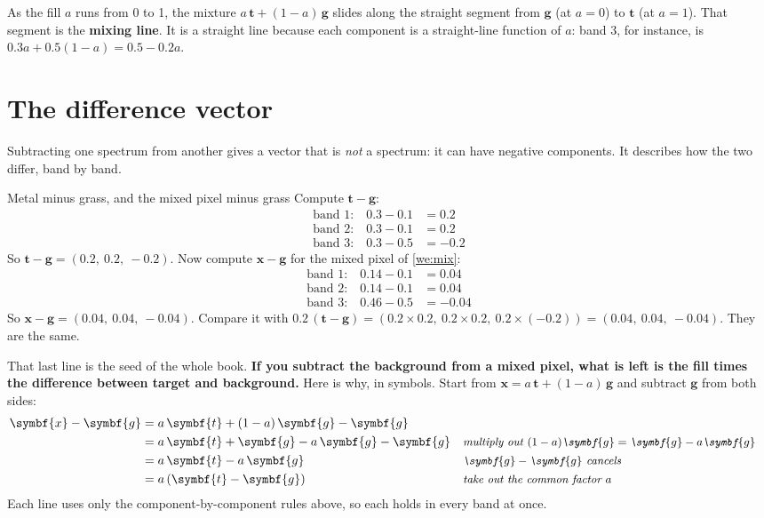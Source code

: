 \documentclass[11pt,a4paper,oneside,openany]{book}
\newcommand{\B}[1]{{\symbf{#1}}}
\newcommand{\B}[1]{{\bm{#1}}}
\newcommand{\vx}{\B{x}}
\newcommand{\vt}{\B{t}}
\newcommand{\vg}{\B{g}}
\newcommand{\why}[1]{&&\text{\small\itshape #1}}
\begin{document}
As the fill $a$ runs from 0 to 1, the mixture $a\,\vt+(1-a)\,\vg$ slides along the straight segment from $\vg$ (at
$a=0$) to $\vt$ (at $a=1$). That segment is the \textbf{mixing line}. It is a straight line because each component is a
straight-line function of $a$: band 3, for instance, is $0.3a+0.5(1-a)=0.5-0.2a$.

\section{The difference vector}

Subtracting one spectrum from another gives a vector that is \emph{not} a spectrum: it can have negative components. It
describes how the two differ, band by band.

\begin{worked}[label=we:diff]{Metal minus grass, and the mixed pixel minus grass}
Compute $\vt-\vg$:
\begin{align*}
\text{band 1:}\quad 0.3-0.1 &= 0.2\\
\text{band 2:}\quad 0.3-0.1 &= 0.2\\
\text{band 3:}\quad 0.3-0.5 &= -0.2
\end{align*}
So $\vt-\vg=(0.2,\ 0.2,\ -0.2)$. Now compute $\vx-\vg$ for the mixed pixel of \cref{we:mix}:
\begin{align*}
\text{band 1:}\quad 0.14-0.1 &= 0.04\\
\text{band 2:}\quad 0.14-0.1 &= 0.04\\
\text{band 3:}\quad 0.46-0.5 &= -0.04
\end{align*}
So $\vx-\vg=(0.04,\ 0.04,\ -0.04)$. Compare it with $0.2\,(\vt-\vg)=(0.2\times0.2,\ 0.2\times0.2,\ 0.2\times(-0.2))
=(0.04,\ 0.04,\ -0.04)$. They are the same.
\end{worked}

That last line is the seed of the whole book. \textbf{If you subtract the background from a mixed pixel, what is left is
the fill times the difference between target and background.} Here is why, in symbols. Start from
$\vx=a\,\vt+(1-a)\,\vg$ and subtract $\vg$ from both sides:
\begin{align*}
\vx-\vg &= a\,\vt+(1-a)\,\vg-\vg\\
        &= a\,\vt+\vg-a\,\vg-\vg \why{multiply out $(1-a)\vg=\vg-a\vg$}\\
        &= a\,\vt-a\,\vg \why{$\vg-\vg$ cancels}\\
        &= a\,(\vt-\vg) \why{take out the common factor $a$}
\end{align*}
Each line uses only the component-by-component rules above, so each holds in every band at once.
\end{document}
